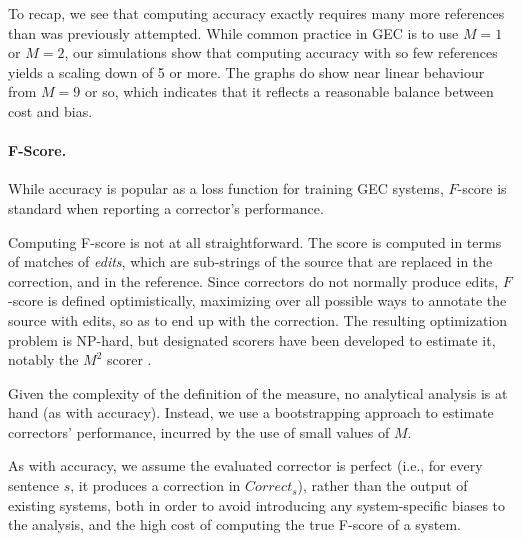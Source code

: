 \documentclass[letter,11pt]{article}
\begin{document}
 To recap, we see that computing accuracy exactly requires many more references than was previously attempted.
 While common practice in GEC is to use $M=1$ or $M=2$, our simulations show that computing accuracy with
 so few references yields a scaling down of 5 or more. The graphs do show near linear behaviour from $M=9$ or
 so, which indicates that it reflects a reasonable balance between cost and bias.
 
 \paragraph{F-Score.}
 While accuracy is popular as a loss function for training GEC systems,
 $F$-score is standard when reporting a corrector's performance.

 Computing F-score is not at all straightforward. The score is computed
 in terms of matches of {\it edits}, which are sub-strings of the source
 that are replaced in the correction, and in the reference. Since correctors
 do not normally produce edits, $F$-score is defined optimistically, maximizing
 over all possible ways to annotate the source with edits, so as to end
 up with the correction. 
 The resulting optimization problem is NP-hard, but designated scorers
 have been developed to estimate it, notably the $M^2$ scorer
 \cite{dahlmeier2012better}.

 Given the complexity of the definition of the measure, no analytical analysis is at hand (as with accuracy). Instead, we use a bootstrapping
 approach to estimate correctors' performance,
 incurred by the use of small values of $M$.
 


 As with accuracy, we assume the evaluated corrector is perfect 
 (i.e., for every sentence $s$, it produces a correction in $Correct_s$),
 rather than the output of existing systems, both
 in order to avoid introducing any system-specific biases to the analysis,
 and the high cost of computing the true F-score of a system.
\end{document}
